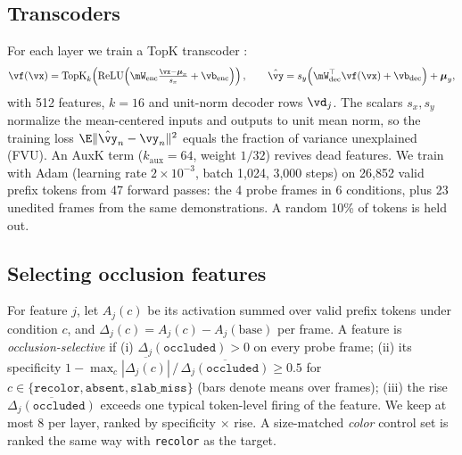 \documentclass{article} %
\newcommand{\occ}{\texttt{occluded}}
\newcommand{\cond}[1]{\texttt{#1}}
\begin{document}
\subsection{Transcoders}
\label{sec:tc}
For each layer we train a TopK transcoder \citep{dunefsky2024transcoders,gao2025scaling}:
\begin{equation}
  \vf(\vx) = \mathrm{TopK}_k\!\left(\mathrm{ReLU}\!\left(\mW_{\text{enc}}\tfrac{\vx-\boldsymbol\mu_x}{s_x}+\vb_{\text{enc}}\right)\right),\qquad
  \hat\vy = s_y\!\left(\mW_{\text{dec}}^\top\vf(\vx)+\vb_{\text{dec}}\right)+\boldsymbol\mu_y,
\end{equation}
with 512 features, $k{=}16$ and unit-norm decoder rows $\vd_j$. The scalars $s_x,s_y$ normalize the mean-centered inputs and outputs to unit mean norm, so the training loss $\E\|\hat\vy_n-\vy_n\|^2$ equals the fraction of variance unexplained (FVU). An AuxK term ($k_{\text{aux}}{=}64$, weight $1/32$) revives dead features. We train with Adam (learning rate $2\times10^{-3}$, batch 1,024, 3,000 steps) on 26,852 valid prefix tokens from 47 forward passes: the 4 probe frames in 6 conditions, plus 23 unedited frames from the same demonstrations. A random 10\% of tokens is held out.

\subsection{Selecting occlusion features}
For feature $j$, let $A_{j}(c)$ be its activation summed over valid prefix tokens under condition $c$, and $\Delta_{j}(c)=A_j(c)-A_j(\text{base})$ per frame. A feature is \emph{occlusion-selective} if
(i) $\Delta_j(\occ)>0$ on every probe frame;
(ii) its specificity $1-\max_{c}\overline{|\Delta_j(c)|}\,/\,\overline{\Delta_j(\occ)}\ge0.5$ for $c\in\{\cond{recolor},\cond{absent},\cond{slab\_miss}\}$ (bars denote means over frames);
(iii) the rise $\overline{\Delta_j(\occ)}$ exceeds one typical token-level firing of the feature.
We keep at most 8 per layer, ranked by specificity $\times$ rise. A size-matched \emph{color} control set is ranked the same way with \cond{recolor} as the target.
\end{document}
